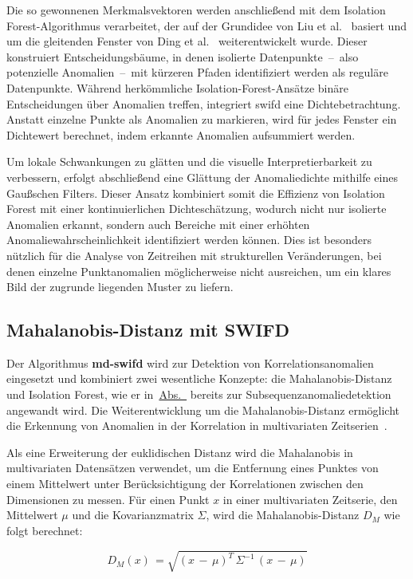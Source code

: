Die so gewonnenen Merkmalsvektoren werden anschließend mit dem Isolation Forest-Algorithmus verarbeitet, der auf der Grundidee von Liu et al.~\cite{Liu2012}
basiert und um die gleitenden Fenster von Ding et al.~\cite{Ding2013} weiterentwickelt wurde. Dieser konstruiert Entscheidungsbäume, in denen isolierte
Datenpunkte~–~also potenzielle Anomalien~–~mit kürzeren Pfaden identifiziert werden als
reguläre Datenpunkte. Während herkömmliche Isolation-Forest-Ansätze binäre Entscheidungen über Anomalien treffen, integriert \ac{swifd} eine Dichtebetrachtung.
Anstatt einzelne Punkte als Anomalien zu markieren, wird für jedes Fenster ein Dichtewert berechnet, indem erkannte Anomalien aufsummiert werden.

Um lokale Schwankungen zu glätten und die visuelle Interpretierbarkeit zu verbessern, erfolgt abschließend eine Glättung der Anomaliedichte mithilfe eines
Gaußschen Filters. Dieser Ansatz kombiniert somit die Effizienz von Isolation Forest mit einer kontinuierlichen Dichteschätzung, wodurch nicht nur isolierte
Anomalien erkannt, sondern auch Bereiche mit einer erhöhten Anomaliewahrscheinlichkeit identifiziert werden können. Dies ist besonders nützlich für die
Analyse von Zeitreihen mit strukturellen Veränderungen, bei denen einzelne Punktanomalien möglicherweise nicht ausreichen, um ein klares Bild der zugrunde
liegenden Muster zu liefern.

\subsection{Mahalanobis-Distanz mit SWIFD}
Der Algorithmus \textbf{\ac{md-swifd}} wird zur Detektion von Korrelationsanomalien eingesetzt und kombiniert zwei
wesentliche Konzepte: die Mahala\-nobis-Distanz und Isolation Forest, wie er in~\hyperref[subsec:swifd]{Abs.~} bereits
zur Subsequenzanomaliedetektion angewandt wird. Die Weiterentwicklung um die Mahalanobis-Distanz ermöglicht die Erkennung von Anomalien in der Korrelation
in multivariaten Zeitserien~\cite{McLachlan1999}.

Als eine Erweiterung der euklidischen Distanz wird die Mahalanobis in multivariaten Datensätzen verwendet, um die Entfernung eines Punktes von einem Mittelwert unter
Berücksichtigung der Korrelationen zwischen den Dimensionen zu messen. Für einen Punkt $x$ in einer multivariaten Zeitserie, den Mittelwert $\mu$ und die
Kovarianzmatrix $\Sigma$, wird die Mahalanobis-Distanz $D_M$ wie folgt berechnet:

\begin{equation}
    D_M(x)\, = \sqrt{{\left( x\,-\,\mu \right)}^T\, \Sigma^{-1}\,(x\,-\,\mu)}
\label{eq:mahalanobis_dist}
\end{equation}

